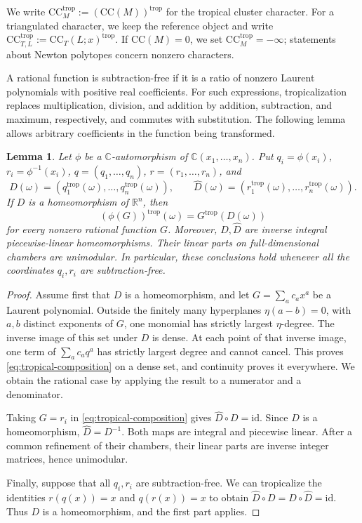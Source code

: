 \documentclass[11pt]{amsart}
\numberwithin{equation}{section}
\newtheorem{lemma}[theorem]{Lemma}
\theoremstyle{definition}
\theoremstyle{remark}
\newcommand{\CC}{\mathrm{CC}}
\newcommand{\RR}{\mathbb R}
\begin{document}
We write
$\CC^{\mathrm{trop}}_M:=(\CC(M))^{\mathrm{trop}}$
for the tropical cluster character. For a triangulated character, we
keep the reference object and write
$\CC^{\mathrm{trop}}_{T,L}:=\CC_T(L;x)^{\mathrm{trop}}$.
If $\CC(M)=0$, we set
$\CC^{\mathrm{trop}}_M=-\infty$; statements about Newton polytopes
concern nonzero characters.

A rational function is subtraction-free if it is a ratio of nonzero
Laurent polynomials with positive real coefficients. For such expressions,
tropicalization replaces multiplication, division, and addition by addition,
subtraction, and maximum, respectively, and commutes with substitution.
The following lemma allows arbitrary coefficients in the function being
transformed.

\begin{lemma}\label{lem:tropical-composition}
Let $\phi$ be a $\mathbb C$-automorphism of
$\mathbb C(x_1,\ldots,x_n)$. Put $q_i=\phi(x_i)$, $r_i=\phi^{-1}(x_i)$,
$q=(q_1,\ldots,q_n)$, $r=(r_1,\ldots,r_n)$, and
\[ D(\omega)=(q_1^{\mathrm{trop}}(\omega),\ldots,q_n^{\mathrm{trop}}(\omega)),\qquad \widehat D(\omega)=(r_1^{\mathrm{trop}}(\omega),\ldots,r_n^{\mathrm{trop}}(\omega)). \]
If $D$ is a homeomorphism of $\RR^n$, then
\begin{equation}\label{eq:tropical-composition} (\phi(G))^{\mathrm{trop}}(\omega)=G^{\mathrm{trop}}(D(\omega))\end{equation}
for every nonzero rational function $G$. Moreover, $D,\widehat D$ are inverse
integral piecewise-linear homeomorphisms. Their linear parts on
full-dimensional chambers are \emph{unimodular}.
In particular, these conclusions hold whenever all the coordinates
$q_i,r_i$ are subtraction-free.
\end{lemma}

\begin{proof}
Assume first that $D$ is a homeomorphism, and let
$G=\sum_a c_ax^a$ be a Laurent polynomial. Outside the finitely many
hyperplanes $\eta(a-b)=0$, with $a,b$ distinct exponents of $G$,
one monomial has strictly largest $\eta$-degree. The inverse image of
this set under $D$ is dense. At each point of that inverse image, one
term of $\sum_a c_aq^a$ has strictly largest degree and cannot cancel.
This proves \eqref{eq:tropical-composition} on a dense set, and continuity
proves it everywhere. We obtain the rational case by applying the result
to a numerator and a denominator.

Taking $G=r_i$ in \eqref{eq:tropical-composition} gives
$\widehat D\circ D=\mathrm{id}$. Since $D$ is a homeomorphism,
$\widehat D=D^{-1}$. Both maps are integral and piecewise linear. After a
common refinement of their chambers, their linear parts are inverse
integer matrices, hence unimodular.

Finally, suppose that all $q_i,r_i$ are subtraction-free. We
can tropicalize the identities $r(q(x))=x$ and $q(r(x))=x$ to
obtain $\widehat D\circ D=D\circ \widehat D=\mathrm{id}$. Thus $D$ is a
homeomorphism, and the first part applies.
\end{proof}
\end{document}
